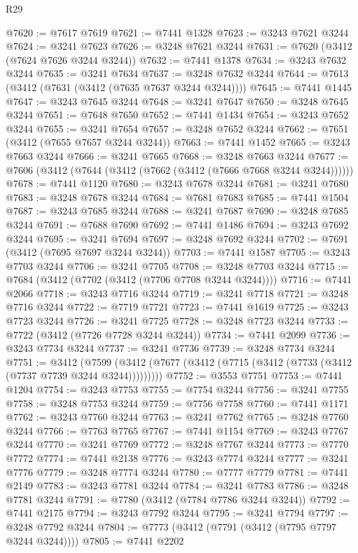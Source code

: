 \begin{lexlean}{R29}
\begin{coremodule}
@7620 := @7617 @7619
@7621 := @7441 @1328
@7623 := @3243 @7621 @3244
@7624 := @3241 @7623
@7626 := @3248 @7621 @3244
@7631 := @7620 (@3412 (@7624 @7626 @3244 @3244))
@7632 := @7441 @1378
@7634 := @3243 @7632 @3244
@7635 := @3241 @7634
@7637 := @3248 @7632 @3244
@7644 := @7613 (@3412 (@7631 (@3412 (@7635 @7637 @3244 @3244))))
@7645 := @7441 @1445
@7647 := @3243 @7645 @3244
@7648 := @3241 @7647
@7650 := @3248 @7645 @3244
@7651 := @7648 @7650
@7652 := @7441 @1434
@7654 := @3243 @7652 @3244
@7655 := @3241 @7654
@7657 := @3248 @7652 @3244
@7662 := @7651 (@3412 (@7655 @7657 @3244 @3244))
@7663 := @7441 @1452
@7665 := @3243 @7663 @3244
@7666 := @3241 @7665
@7668 := @3248 @7663 @3244
@7677 := @7606 (@3412 (@7644 (@3412 (@7662 (@3412 (@7666 @7668 @3244 @3244))))))
@7678 := @7441 @1120
@7680 := @3243 @7678 @3244
@7681 := @3241 @7680
@7683 := @3248 @7678 @3244
@7684 := @7681 @7683
@7685 := @7441 @1504
@7687 := @3243 @7685 @3244
@7688 := @3241 @7687
@7690 := @3248 @7685 @3244
@7691 := @7688 @7690
@7692 := @7441 @1486
@7694 := @3243 @7692 @3244
@7695 := @3241 @7694
@7697 := @3248 @7692 @3244
@7702 := @7691 (@3412 (@7695 @7697 @3244 @3244))
@7703 := @7441 @1587
@7705 := @3243 @7703 @3244
@7706 := @3241 @7705
@7708 := @3248 @7703 @3244
@7715 := @7684 (@3412 (@7702 (@3412 (@7706 @7708 @3244 @3244))))
@7716 := @7441 @2066
@7718 := @3243 @7716 @3244
@7719 := @3241 @7718
@7721 := @3248 @7716 @3244
@7722 := @7719 @7721
@7723 := @7441 @1619
@7725 := @3243 @7723 @3244
@7726 := @3241 @7725
@7728 := @3248 @7723 @3244
@7733 := @7722 (@3412 (@7726 @7728 @3244 @3244))
@7734 := @7441 @2099
@7736 := @3243 @7734 @3244
@7737 := @3241 @7736
@7739 := @3248 @7734 @3244
@7751 := @3412
    (@7599 (@3412 (@7677 (@3412 (@7715 (@3412 (@7733 (@3412 (@7737 @7739 @3244 @3244)))))))))
@7752 := @3553 @7751
@7753 := @7441 @1204
@7754 := @3243 @7753
@7755 := @7754 @3244
@7756 := @3241 @7755
@7758 := @3248 @7753 @3244
@7759 := @7756 @7758
@7760 := @7441 @1171
@7762 := @3243 @7760 @3244
@7763 := @3241 @7762
@7765 := @3248 @7760 @3244
@7766 := @7763 @7765
@7767 := @7441 @1154
@7769 := @3243 @7767 @3244
@7770 := @3241 @7769
@7772 := @3248 @7767 @3244
@7773 := @7770 @7772
@7774 := @7441 @2138
@7776 := @3243 @7774 @3244
@7777 := @3241 @7776
@7779 := @3248 @7774 @3244
@7780 := @7777 @7779
@7781 := @7441 @2149
@7783 := @3243 @7781 @3244
@7784 := @3241 @7783
@7786 := @3248 @7781 @3244
@7791 := @7780 (@3412 (@7784 @7786 @3244 @3244))
@7792 := @7441 @2175
@7794 := @3243 @7792 @3244
@7795 := @3241 @7794
@7797 := @3248 @7792 @3244
@7804 := @7773 (@3412 (@7791 (@3412 (@7795 @7797 @3244 @3244))))
@7805 := @7441 @2202

\end{coremodule}
\end{lexlean}
